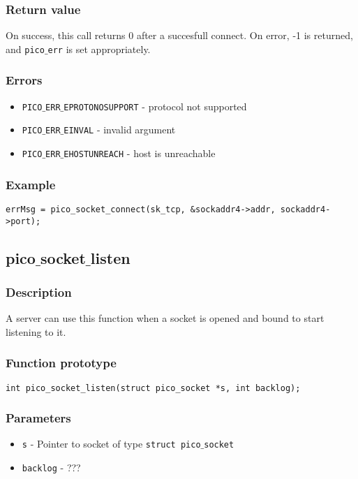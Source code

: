 \subsubsection*{Return value}
On success, this call returns 0 after a succesfull connect.
On error, -1 is returned, and \texttt{pico$\_$err} is set appropriately.

\subsubsection*{Errors}
\begin{itemize}[noitemsep]
\item \texttt{PICO$\_$ERR$\_$EPROTONOSUPPORT} - protocol not supported
\item \texttt{PICO$\_$ERR$\_$EINVAL} - invalid argument
\item \texttt{PICO$\_$ERR$\_$EHOSTUNREACH} - host is unreachable 
\end{itemize}

\subsubsection*{Example}
\begin{verbatim}
errMsg = pico_socket_connect(sk_tcp, &sockaddr4->addr, sockaddr4->port);
\end{verbatim}


\subsection{pico$\_$socket$\_$listen}

\subsubsection*{Description}
A server can use this function when a socket is opened and bound to start listening to it.

\subsubsection*{Function prototype}
\begin{verbatim}
int pico_socket_listen(struct pico_socket *s, int backlog);
\end{verbatim}


\subsubsection*{Parameters}
\begin{itemize}[noitemsep]
\item \texttt{s} - Pointer to socket of type \texttt{struct pico$\_$socket}
\item \texttt{backlog} - ???
\end{itemize}

